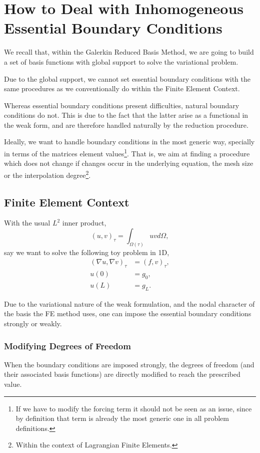 \documentclass[../main.tex]{subfiles}
\begin{document}
    
\section{How to Deal with Inhomogeneous Essential Boundary Conditions}
We recall that, within the Galerkin Reduced Basis Method, we are going to build a set of basis functions with global support to solve the variational problem.

Due to the global support, we cannot set essential boundary conditions with the same procedures as we conventionally do within the Finite Element Context.

Whereas essential boundary conditions present difficulties, natural boundary conditions do not. 
This is due to the fact that the latter arise as a functional in the weak form, and are therefore handled naturally by the reduction procedure. 

Ideally, we want to handle boundary conditions in the most generic way, specially in terms of the matrices element values\footnote{
    If we have to modify the forcing term it should not be seen as an issue, since by definition that term is already the most generic one in all problem definitions.}.
That is, we aim at finding a procedure which does not change if changes occur in the underlying equation, the mesh size or the interpolation degree\footnote{Within the context of Lagrangian Finite Elements.}.

\subsection{Finite Element Context}
With the usual $L^2$ inner product, 
\begin{equation}
    (u,v)_\tau = \int_{\Omega(\tau)} u v d\Omega,
\end{equation}
say we want to solve the following toy problem in 1D, 
\begin{subequations}
    \begin{align}
        (\nabla u, \nabla v)_\tau &= (f, v)_\tau, \\
        u(0) &= g_0, \\
        u(L) &= g_L.
    \end{align}
\end{subequations}

Due to the variational nature of the weak formulation, and the nodal character of the basis the FE method uses, one can impose the essential boundary conditions strongly or weakly.

\subsubsection{Modifying Degrees of Freedom}
When the boundary conditions are imposed strongly, the degrees of freedom (and their associated basis functions) are directly modified to reach the prescribed value.
\end{document}
